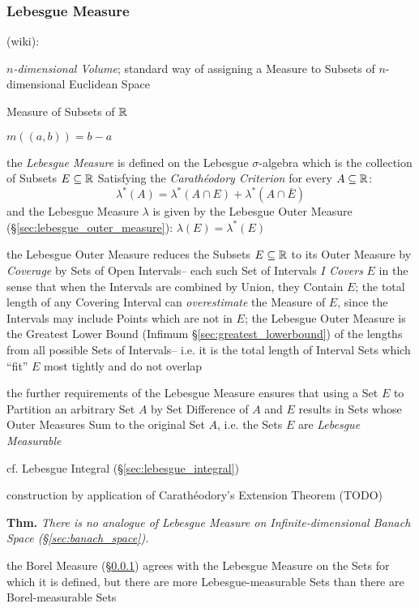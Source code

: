 \subsubsection{Lebesgue Measure}\label{sec:lebesgue_measure}

(wiki):

\emph{$n$-dimensional Volume}; standard way of assigning a Measure to Subsets of
$n$-dimensional Euclidean Space

Measure of Subsets of $\mathbb{R}$

$m((a,b)) = b - a$

the \emph{Lebesgue Measure} is defined on the Lebesgue $\sigma$-algebra which is
the collection of Subsets $E \subseteq \mathbb{R}$ Satisfying the
\emph{Carath\'eodory Criterion} for every $A \subseteq \mathbb{R}$:
\[
  \lambda^*(A) = \lambda^*(A \cap E) + \lambda^*(A \cap \bar{E})
\]
and the Lebesgue Measure $\lambda$ is given by the Lebesgue Outer Measure
(\S\ref{sec:lebesgue_outer_measure}): $\lambda(E) = \lambda^*(E)$

the Lebesgue Outer Measure reduces the Subsets $E \subseteq \mathbb{R}$ to its Outer
Measure by \emph{Coverage} by Sets of Open Intervals-- each such Set of
Intervals $I$ \emph{Covers} $E$ in the sense that when the Intervals are
combined by Union, they Contain $E$; the total length of any Covering Interval
can \emph{overestimate} the Measure of $E$, since the Intervals may include
Points which are not in $E$; the Lebesgue Outer Measure is the Greatest Lower
Bound (Infimum \S\ref{sec:greatest_lowerbound}) of the lengths from all possible
Sets of Intervals-- i.e. it is the total length of Interval Sets which ``fit''
$E$ most tightly and do not overlap

the further requirements of the Lebesgue Measure ensures that using a Set $E$ to
Partition an arbitrary Set $A$ by Set Difference of $A$ and $E$ results in Sets
whose Outer Measures Sum to the original Set $A$, i.e. the Sets $E$ are
\emph{Lebesgue Measurable}

\fist cf. Lebesgue Integral (\S\ref{sec:lebesgue_integral})

construction by application of Carath\'eodory's Extension Theorem (TODO)

\textbf{Thm.} \emph{
  There is no analogue of Lebesgue Measure on Infinite-dimensional Banach Space
  (\S\ref{sec:banach_space}).
}

the Borel Measure (\S\ref{sec:lebesgue_measure}) agrees with the Lebesgue
Measure on the Sets for which it is defined, but there are more
Lebesgue-measurable Sets than there are Borel-measurable Sets

